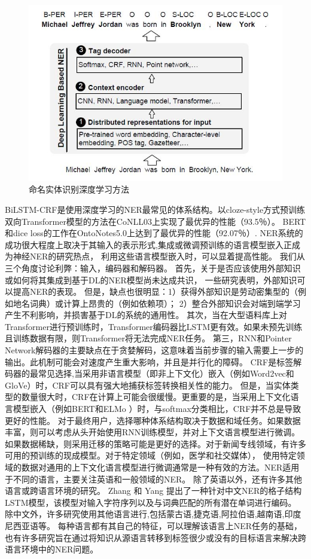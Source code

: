  \begin{figure}[htbp]
  \centering
  \includegraphics[scale=0.8]{./images/nerDL.jpg}
  \caption{命名实体识别深度学习方法}
  \label{fig:nerDL}
\end{figure}

BiLSTM-CRF是使用深度学习的NER最常见的体系结构。以cloze-style方式预训练双向Transformer模型的方法在CoNLL03上实现了最优异的性能（93.5％）\cite{baevski2019cloze}。 
BERT和dice loss的工作在OntoNotes5.0上达到了最优异的性能（92.07％）\cite{li2019dice}.
NER系统的成功很大程度上取决于其输入的表示形式,集成或微调预训练的语言模型嵌入正成为神经NER的研究热点，
利用这些语言模型嵌入时，可以显着提高性能。
我们从三个角度讨论利弊：输入，编码器和解码器。
首先，关于是否应该使用外部知识或如何将其集成到基于DL的NER模型尚未达成共识，
一些研究表明，外部知识可以提高NER的表现。
但是，缺点也很明显：1）获得外部知识是劳动密集型的（例如地名词典）或计算上昂贵的（例如依赖项）； 2）整合外部知识会对端到端学习产生不利影响，并损害基于DL的系统的通用性。
其次，当在大型语料库上对Transformer进行预训练时，Transformer编码器比LSTM更有效。如果未预先训练且训练数据有限，则Transformer将无法完成NER任务\cite{guo2019star,yan2019tener}。
第三，RNN和Pointer Network解码器的主要缺点在于贪婪解码，这意味着当前步骤的输入需要上一步的输出。此机制可能会对速度产生重大影响，并且是并行化的障碍。 
CRF是标签解码器的最常见选择,当采用非语言模型（即非上下文化）嵌入（例如Word2vec和GloVe）时，CRF可以具有强大地捕获标签转换相关性的能力。
但是，当实体类型的数量很大时，CRF在计算上可能会很缓慢。更重要的是，当采用上下文化语言模型嵌入（例如BERT和ELMo ）时，与softmax分类相比，CRF并不总是导致更好的性能。
对于最终用户，选择哪种体系结构取决于数据和域任务。如果数据丰富，则可以考虑从头开始使用RNN训练模型，并对上下文语言模型进行微调。
如果数据稀缺，则采用迁移的策略可能是更好的选择。对于新闻专线领域，有许多可用的预训练的现成模型。对于特定领域（例如，医学和社交媒体），
使用特定领域的数据对通用的上下文化语言模型进行微调通常是一种有效的方法。NER适用于不同的语言，主要关注英语和一般领域的NER。
除了英语以外，还有许多其他语言或跨语言环境的研究。
 Zhang 和 Yang 提出了一种针对中文NER的格子结构LSTM模型，该模型对输入字符序列以及与词典匹配的所有潜在单词进行编码\cite{zhang2018chinese}。
 除中文外，许多研究使用其他语言进行,包括蒙古语,捷克语,阿拉伯语,越南语,印度尼西亚语等。
 每种语言都有其自己的特征，可以理解该语言上NER任务的基础，也有许多研究旨在通过将知识从源语言转移到标签很少或没有的目标语言来解决跨语言环境中的NER问题。